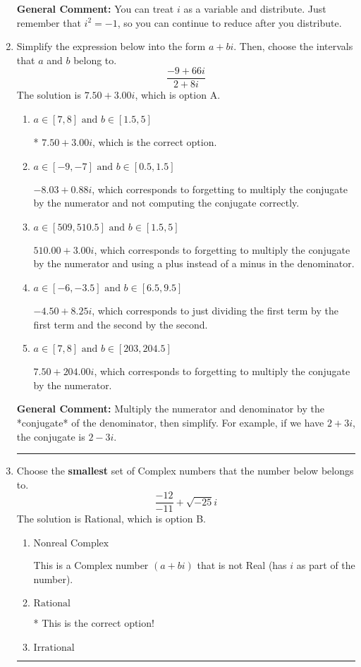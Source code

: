 \documentclass{extbook}[14pt]
\newcommand{\litem}[1]{\item #1

\rule{\textwidth}{0.4pt}}
\begin{document}
\begin{enumerate}
{\textbf{General Comment:} You can treat $i$ as a variable and distribute. Just remember that $i^2=-1$, so you can continue to reduce after you distribute.
}
\litem{
Simplify the expression below into the form $a+bi$. Then, choose the intervals that $a$ and $b$ belong to.
\[ \frac{-9 + 66 i}{2 + 8 i} \]The solution is \( 7.50  + 3.00 i \), which is option A.\begin{enumerate}[label=\Alph*.]
\item \( a \in [7, 8] \text{ and } b \in [1.5, 5] \)

* $7.50  + 3.00 i$, which is the correct option.
\item \( a \in [-9, -7] \text{ and } b \in [0.5, 1.5] \)

 $-8.03  + 0.88 i$, which corresponds to forgetting to multiply the conjugate by the numerator and not computing the conjugate correctly.
\item \( a \in [509, 510.5] \text{ and } b \in [1.5, 5] \)

 $510.00  + 3.00 i$, which corresponds to forgetting to multiply the conjugate by the numerator and using a plus instead of a minus in the denominator.
\item \( a \in [-6, -3.5] \text{ and } b \in [6.5, 9.5] \)

 $-4.50  + 8.25 i$, which corresponds to just dividing the first term by the first term and the second by the second.
\item \( a \in [7, 8] \text{ and } b \in [203, 204.5] \)

 $7.50  + 204.00 i$, which corresponds to forgetting to multiply the conjugate by the numerator.
\end{enumerate}

\textbf{General Comment:} Multiply the numerator and denominator by the *conjugate* of the denominator, then simplify. For example, if we have $2+3i$, the conjugate is $2-3i$.
}
\litem{
Choose the \textbf{smallest} set of Complex numbers that the number below belongs to.
\[ \frac{-12}{-11}+\sqrt{-25}i \]The solution is \( \text{Rational} \), which is option B.\begin{enumerate}[label=\Alph*.]
\item \( \text{Nonreal Complex} \)

This is a Complex number $(a+bi)$ that is not Real (has $i$ as part of the number).
\item \( \text{Rational} \)

* This is the correct option!
\item \( \text{Irrational} \)


\end{enumerate}}
\end{enumerate}
\end{document}
